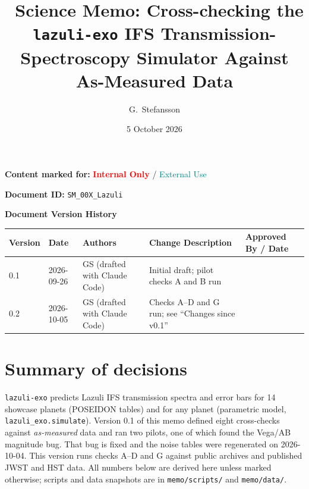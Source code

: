 \documentclass[11pt]{article}
\title{\observatory\ Science Memo: Cross-checking the \texttt{lazuli-exo} IFS Transmission-Spectroscopy Simulator Against As-Measured Data}
\author{G.~Stefansson \\}
\date{5 October 2026}
\newcommand{\docidprefix}{SM\_00X\_Lazuli}
\begin{document}
\maketitle
\thispagestyle{fancy}

\begin{center}
\begin{tcolorbox}[colback=gray!10!white, colframe=gray!50!black,
                  boxrule=0.5pt, width=0.9\textwidth]
\centering
\textbf{Content marked for:} \textcolor{red}{\textbf{Internal Only}} / \textcolor{teal}{External Use}
\end{tcolorbox}
\end{center}

\begin{center}
\textbf{Document ID:} \texttt{\docidprefix}
\end{center}

\vspace{1em}
\noindent
\textbf{Document Version History}
\vspace{0.5em}

\begin{tabular}{|p{1.5cm}|p{2.5cm}|p{3cm}|p{4cm}|p{4cm}|}
\hline
\textbf{Version} & \textbf{Date} & \textbf{Authors} & \textbf{Change Description} & \textbf{Approved By / Date} \\
\hline
0.1 & 2026-09-26 & GS (drafted with Claude Code) & Initial draft; pilot checks A and B run & \\
\hline
0.2 & 2026-10-05 & GS (drafted with Claude Code) & Checks A--D and G run; see ``Changes since v0.1'' & \\
\hline
\end{tabular}

\vspace{1.5em}

\section*{Summary of decisions}

\texttt{lazuli-exo} predicts Lazuli IFS transmission spectra and error bars for 14 showcase planets (POSEIDON tables) and for any planet (parametric model, \texttt{lazuli\_exo.simulate}). Version 0.1 of this memo defined eight cross-checks against \emph{as-measured} data and ran two pilots, one of which found the Vega/AB magnitude bug. That bug is fixed and the noise tables were regenerated on 2026-10-04. This version runs checks A--D and G against public archives and published JWST and HST data. All numbers below are derived here unless marked otherwise; scripts and data snapshots are in \texttt{memo/scripts/} and \texttt{memo/data/}.
\end{document}
